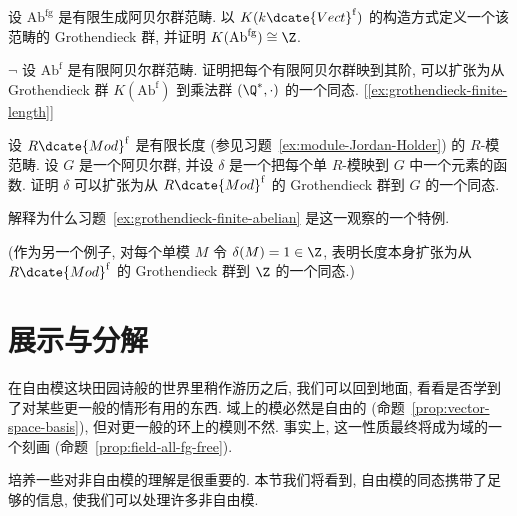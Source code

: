 \begin{prob}
\label{ex:grothendieck-abelian-fg}
设 $\mathrm{Ab}^{\mathrm{fg}}$ 是有限生成阿贝尔群范畴. 以 $K(k\dcate{Vect}^{\mathrm f})$ 的构造方式定义一个该范畴的 Grothendieck 群, 并证明 $K(\mathrm{Ab}^{\mathrm{fg}})\cong\Z$.
\end{prob}

\begin{prob}
\label{ex:grothendieck-finite-abelian}
$\neg$ 设 $\mathrm{Ab}^{\mathrm{f}}$ 是有限阿贝尔群范畴. 证明把每个有限阿贝尔群映到其阶, 可以扩张为从 Grothendieck 群 $K(\mathrm{Ab}^{\mathrm{f}})$ 到乘法群 $(\Q^*,\cdot)$ 的一个同态. [\ref{ex:grothendieck-finite-length}]
\end{prob}

\begin{prob}
\label{ex:grothendieck-finite-length}
设 $R\dcate{Mod}^{\mathrm f}$ 是有限长度 (参见习题~\ref{ex:module-Jordan-Holder}) 的 $R$-模范畴. 设 $G$ 是一个阿贝尔群, 并设 $\delta$ 是一个把每个单 $R$-模映到 $G$ 中一个元素的函数. 证明 $\delta$ 可以扩张为从 $R\dcate{Mod}^{\mathrm f}$ 的 Grothendieck 群到 $G$ 的一个同态.

解释为什么习题~\ref{ex:grothendieck-finite-abelian} 是这一观察的一个特例.

(作为另一个例子, 对每个单模 $M$ 令 $\delta(M)=1\in\Z$, 表明长度本身扩张为从 $R\dcate{Mod}^{\mathrm f}$ 的 Grothendieck 群到 $\Z$ 的一个同态.)
\end{prob}

\section{展示与分解}\label{sec:presentations-resolutions}

在自由模这块田园诗般的世界里稍作游历之后, 我们可以回到地面, 看看是否学到了对某些更一般的情形有用的东西. 域上的模必然是自由的 (命题~\ref{prop:vector-space-basis}), 但对更一般的环上的模则不然. 事实上, 这一性质最终将成为域的一个刻画 (命题~\ref{prop:field-all-fg-free}).

培养一些对非自由模的理解是很重要的. 本节我们将看到, 自由模的同态携带了足够的信息, 使我们可以处理许多非自由模.

